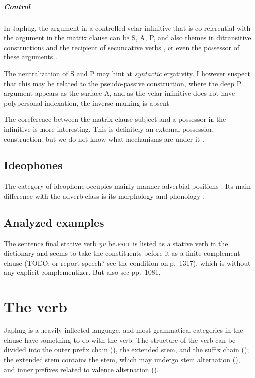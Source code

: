 \documentclass[a4paper, oneside, 12pt]{report}
\newcommand*{\citesec}[1]{\S~{#1}}
\newcommand*{\citechap}[1]{Ch~{#1}}
\newcommand*{\citetable}[1]{Table~{#1}}
\newcommand*{\citepage}[1]{p.~{#1}}
\newcommand*{\citepages}[1]{pp.~{#1}}
\newcommand{\form}[1]{\emph{#1}}
\newcommand{\category}[1]{\textsc{#1}}
\begin{document}
\paragraph*{Control} In Japhug, the argument in a controlled velar infinitive
that is co-referential with the argument in the matrix clause
can be S, A, P, and also themes in ditransitive constructions
and the recipient of secundative verbs \citep{jacques2016subjects},
or even the possessor of these arguments \citep[\citepage{1366}]{jacques2021grammar}.

The neutralization of S and P may hint at \emph{syntactic} ergativity.
I however suspect that this may be related to the pseudo-passive construction,
where the deep P argument appears as the surface A,
and as the velar infinitive does not have polypersonal indexation,
the inverse marking is absent.

The coreference between the matrix clause subject and a possessor in the infinitive 
is more interesting.
This is definitely an external possession construction,
but we do not know what mechanisms are under it
\citep{deal2017external}.

\section{Ideophones}

The category of ideophone occupies mainly manner adverbial positions
\citep[\citesec{10.1.7}]{jacques2021grammar}.
Its main difference with the adverb class 
is its morphology \citep[\citesec{10.1.2}]{jacques2021grammar}
and phonology \citep[\citesec{10.1.5}]{jacques2021grammar}.

\section{Analyzed examples}


The sentence final stative verb \form{ŋu} be.\category{fact} is 
listed as a stative verb in the dictionary
and seems to take the constituents before it 
as a finite complement clause (TODO: or report speech? see the condition on \citepage{1317}),
which is without any explicit complementizer. 
But also see \citepages{1081, }

\chapter{The verb}

Japhug is a heavily inflected language, 
and most grammatical categories in the clause 
have something to do with the verb.
The structure of the verb can be divided into 
the outer prefix chain (\citealt[\citetable{11.1}]{jacques2021grammar}),
the extended stem, 
and the suffix chain (\citealt[\citesec{11.3}]{jacques2021grammar});
the extended stem contains the stem, 
which may undergo stem alternation (\citealt[\citechap{12}]{jacques2021grammar}),
and inner prefixes related to valence alternation
(\citealt[\citesec{11.2.2}]{jacques2021grammar}).
\end{document}
